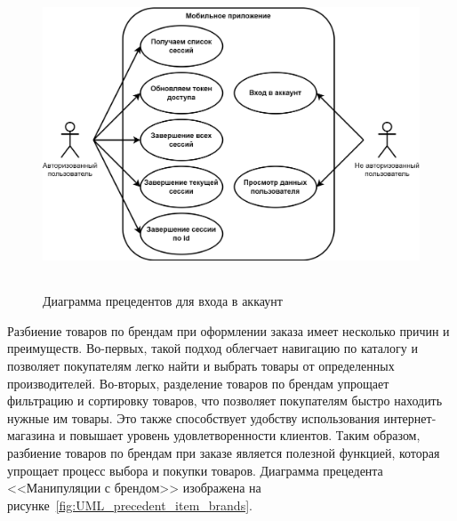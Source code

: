 \begin{figure}[!htb]
    \centering

    \includegraphics[height=9.2cm]
    {images/UML/UML_precedent_sessions.png}

    \caption{Диаграмма прецедентов для входа в аккаунт}

    \label{fig:UML_precedent_sessions}
\end{figure}

Разбиение товаров по брендам при оформлении заказа имеет несколько причин и преимуществ.
Во-первых, такой подход облегчает навигацию по каталогу и позволяет покупателям легко найти и выбрать товары
от определенных производителей.
Во-вторых, разделение товаров по брендам упрощает фильтрацию и сортировку товаров,
что позволяет покупателям быстро находить нужные им товары.
Это также способствует удобству использования интернет-магазина и повышает уровень удовлетворенности клиентов.
Таким образом, разбиение товаров по брендам при заказе является полезной функцией,
которая упрощает процесс выбора и покупки товаров.
Диаграмма прецедента <<Манипуляции с брендом>> изображена на рисунке~\ref{fig:UML_precedent_item_brands}.

